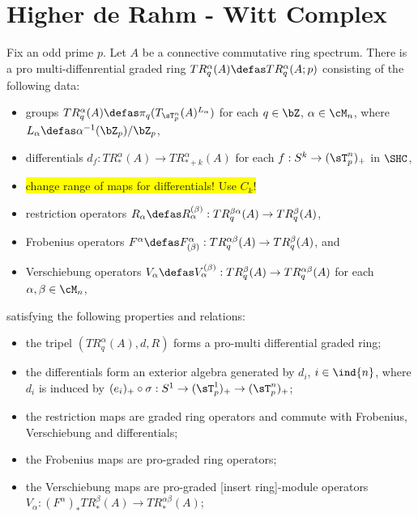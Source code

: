 \section{Higher de Rahm - Witt Complex}
%
%
\begin{thm}\cite[Thm. 3.22]{carlsson2011higher}
Fix an odd prime $p$. Let $A$ be a connective commutative ring spectrum. There is a pro multi-diffenrential graded ring  $TR_q^\alpha(A) \defas TR_q^\alpha(A;p)$ consisting of the following data:
\begin{itemize}
 \item groups $TR^\alpha_q(A) \defas \pi_q ( T_{\sT_p^n}(A)^{L_\alpha} )$ for each $q \in \bZ$, $\alpha \in \cM_n$, where $L_\alpha \defas \alpha^{-1}(\bZ_p) / \bZ_p$,
 \item differentials $d_f: TR^\alpha_*(A) \to TR^\alpha_{*+k}(A)$ for each $f : S^k \to (\sT_p^n)_+$ in $\SHC$,
 \item \colorbox{yellow}{change range of maps for differentials! Use $C_k$!}
 \item restriction operators $R_\alpha \defas R^{(\beta)}_\alpha: TR^{\beta\alpha}_q(A) \to TR^\beta_q(A)$,
 \item Frobenius operators $F^\alpha \defas F^\alpha_{(\beta)}: TR^{\alpha\beta}_q(A) \to TR^\beta_q(A)$, and
 \item Verschiebung operators $V_\alpha \defas V_\alpha^{(\beta)}: TR^\beta_q(A) \to TR^{\alpha\beta}_q(A)$ for each $\alpha,\beta \in \cM_n$,
\end{itemize}
satisfying the following properties and relations:
\begin{itemize}
 \item the tripel $(TR^\alpha_q(A),d,R)$ forms a pro-multi differential graded ring;
 \item the differentials form an exterior algebra generated by $d_i$, $i \in \ind{n}$, where $d_i$ is induced by  $(e_i)_+ \circ \sigma: S^1 \to (\sT^1_p)_+ \to (\sT_p^n)_+$;
 \item the restriction maps are graded ring operators and commute with Frobenius, Verschiebung and differentials;
 \item the Frobenius maps are pro-graded ring operators;
 \item the Verschiebung maps are pro-graded [insert ring]-module operators\\%
    $V_\alpha: (F^\alpha)_* TR_*^\beta(A) \to TR_*^{\alpha\beta}(A)$;

\end{itemize}
\end{thm}
